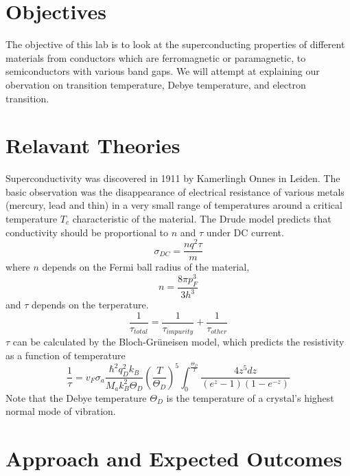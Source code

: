 \documentclass{article}
\begin{document}
    \begin{normalsize}
    
    	\section{Objectives}
        
        The objective of this lab is to look at the superconducting properties of different materials from conductors which are ferromagnetic or paramagnetic, to semiconductors with various band gaps. We will attempt at explaining our obervation on transition temperature, Debye temperature, and electron transition.  
      
		\section{Relavant Theories}
        
       Superconductivity was discovered in 1911 by Kamerlingh Onnes in Leiden. The basic observation was the disappearance of electrical resistance of various metals (mercury, lead and thin) in a very small range of temperatures around a critical temperature $T_c$ characteristic of the material. The Drude model predicts that conductivity should be proportional to $n$ and $\tau$ under DC current.
       \begin{equation*}
           \sigma_{DC}=\frac{nq^2\tau}{m}
       \end{equation*}
       where $n$ depends on the Fermi ball radius of the material,
       \begin{equation*}
           n=\frac{8\pi p^3_F}{3h^3}
       \end{equation*}
       and $\tau$ depends on the terperature.
       \begin{equation*}
           \frac{1}{\tau_{total}}=\frac{1}{\tau_{impurity}}+\frac{1}{\tau_{other}}
       \end{equation*}
       $\tau$ can be calculated by the Bloch-Grüneisen model, which predicts the resistivity as a function of temperature
       \begin{equation*}
           \frac{1}{\tau}=v_F \sigma_a \frac{\hbar^2 q_D^2 k_B}{M_a k_B^2 \Theta_D}(\frac{T}{\Theta_D})^5 \int^{\frac{\Theta_D}{T}}_0\frac{4z^5dz}{(e^z-1)(1-e^{-z})}
       \end{equation*}
       Note that the Debye temperature $\Theta_D$ is the temperature of a crystal's highest normal mode of vibration.
        
	   	\section{Approach and Expected Outcomes}
        

\end{normalsize}
\end{document}
